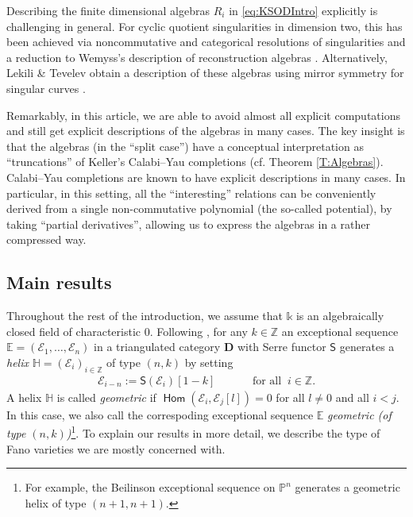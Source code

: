 \documentclass[a4paper,11pt, reqno]{amsart}
\def\E{\mathbb E}
\def\H{\mathbb H}
\def\P{\mathbb P}
\def\Z{\mathbb Z}
\def\DD{\mathbf D}
\def\sE{\mathscr{E}}
\newcommand{\opname}[1]{\operatorname{\mathsf{#1}}}
\newcommand{\Hom}{\opname{Hom}}
\newcommand{\bS}{\mathsf{S}}
\theoremstyle{plain}
\theoremstyle{definition}
\numberwithin{equation}{section}
\begin{document}
Describing the finite dimensional algebras $R_i$ in \eqref{eq:KSODIntro} explicitly is challenging in general. For cyclic quotient singularities in dimension two, this has been achieved via noncommutative and categorical resolutions of singularities and a reduction to Wemyss's description of reconstruction algebras \cite{kalck-karmazyn}. Alternatively, Lekili \& Tevelev obtain a description of these algebras using mirror symmetry for singular curves \cite{LT}.

Remarkably, in this article, we are able to avoid almost all explicit computations and still get explicit descriptions of the algebras in many cases. The key insight is that the algebras (in the ``split case'') have a conceptual interpretation as ``truncations'' of Keller's Calabi--Yau completions \cite{KellerCY} (cf. Theorem \ref{T:Algebras}). Calabi--Yau completions are known to have explicit descriptions in many cases. In particular, in this setting, all the ``interesting'' relations can be conveniently derived from a single non-commutative polynomial (the so-called potential), by taking ``partial derivatives'', allowing us to express the algebras in a rather compressed way. 

\subsection{Main results}
Throughout the rest of the introduction, we assume that $\mathbb{k}$ is an algebraically closed field of characteristic $0$. 
Following \cite{BridgelandStern},
for any $k \in \Z$ an exceptional sequence $\E=(\sE_1, \ldots, \sE_n)$ in a triangulated category $\DD$ with Serre functor $\bS$ generates a \emph{helix} $\H=(\sE_i)_{i \in \Z}$ of type $(n, k)$
by setting 
    \begin{align}
        \sE_{i-n}:=\bS(\sE_{i})[1-k] \qquad \quad \text{ for all } \ i \in \Z.
    \end{align}
    A helix $\H$ is called \emph{geometric} if $\Hom(\sE_i, \sE_j[l])=0$ for all $l \neq 0$ and all $i<j$. In this case, we also call the correspoding exceptional sequence $\E$ \emph{geometric (of type $(n,k)$)}\footnote{For example, the Beilinson exceptional sequence on $\P^n$ generates a geometric helix of type $(n+1,n+1)$.}.
To explain our results in more detail, we describe the type of Fano varieties 
we are mostly concerned with.
\end{document}
